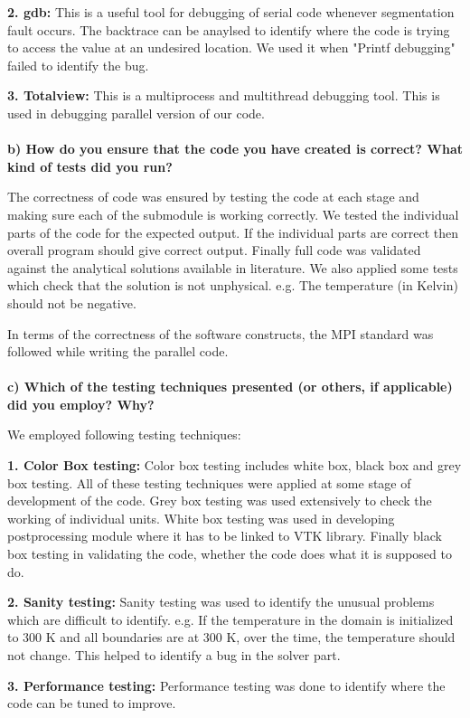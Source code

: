 \documentclass[a4paper, 11pt, oneside]{scrartcl}
\begin{document}
\textbf{2. gdb:} This is a useful tool for debugging of serial code whenever segmentation fault occurs. The backtrace can be anaylsed to identify where the code is trying to access the value at an undesired location. We used it when  "Printf debugging" failed to identify the bug.

\textbf{3. Totalview:} This is a multiprocess and multithread debugging tool. This is used in debugging parallel version of our code.
\\
\\
\textbf{b) How do you ensure that the code you have created is correct? What kind of tests did you run?}

The correctness of code was ensured by testing the code at each stage and making sure each of the submodule is working correctly. We tested the individual parts of the code for the expected output. If the individual parts are correct then overall program should give correct output. Finally full code was validated against the analytical solutions available in literature. We also applied some tests which check that the solution is not unphysical. e.g. The temperature (in Kelvin) should not be negative.

In terms of the correctness of the software constructs, the MPI standard was followed while writing the parallel code.
\\
\\
\textbf{c) Which of the testing techniques presented (or others, if applicable) did you employ? Why?}

We employed following testing techniques:

\textbf{1. Color Box testing:}
Color box testing includes white box, black box and grey box testing. All of these testing techniques were applied at some stage of development of the code. Grey box testing was used extensively to check the working of individual units. White box testing was used in developing postprocessing module where it has to be linked to VTK library. Finally black box testing in validating the code, whether the code does what it is supposed to do. 

\textbf{2. Sanity testing:}
Sanity testing was used to identify the unusual problems which are difficult to identify. e.g. If the temperature in the domain is initialized to 300 K and all boundaries are at 300 K, over the time, the temperature should not change. This helped to identify a bug in the solver part.

\textbf{3. Performance testing:}
Performance testing was done to identify where the code can be tuned to improve.
\end{document}
